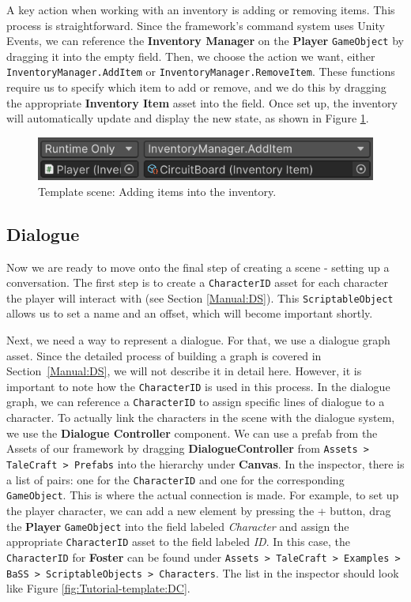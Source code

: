 A key action when working with an inventory is adding or removing items. This process is straightforward. Since the framework's command system uses Unity Events, we can reference the \textbf{Inventory Manager} on the \textbf{Player} \texttt{GameObject} by dragging it into the empty field. Then, we choose the action we want, either \texttt{InventoryManager.AddItem} or \texttt{InventoryManager.RemoveItem}. These functions require us to specify which item to add or remove, and we do this by dragging the appropriate \textbf{Inventory Item} asset into the field. Once set up, the inventory will automatically update and display the new state, as shown in Figure \ref{fig:Tutorial-template:InvAdd}.

\begin{figure}[H]
\centering
\includegraphics[width=1\linewidth]{img/User doc/image_2025-07-09_200842547.png}
\caption{Template scene: Adding items into the inventory.}
\label{fig:Tutorial-template:InvAdd}
\end{figure}

\subsection{Dialogue}
\label{Manual:Tutorial:D}
Now we are ready to move onto the final step of creating a scene - setting up a conversation. The first step is to create a \texttt{CharacterID} asset for each character the player will interact with (see Section \ref{Manual:DS}). This \texttt{ScriptableObject} allows us to set a name and an offset, which will become important shortly.

Next, we need a way to represent a dialogue. For that, we use a dialogue graph asset. Since the detailed process of building a graph is covered in Section~\ref{Manual:DS}, we will not describe it in detail here. However, it is important to note how the \texttt{CharacterID} is used in this process. In the dialogue graph, we can reference a \texttt{CharacterID} to assign specific lines of dialogue to a character. To actually link the characters in the scene with the dialogue system, we use the \textbf{Dialogue Controller} component. We can use a prefab from the Assets of our framework by dragging \textbf{DialogueController} from \texttt{Assets > TaleCraft > Prefabs} into the hierarchy under \textbf{Canvas}. In the inspector, there is a list of pairs: one for the \texttt{CharacterID} and one for the corresponding \texttt{GameObject}. This is where the actual connection is made. For example, to set up the player character, we can add a new element by pressing the + button, drag the \textbf{Player} \texttt{GameObject} into the field labeled \textit{Character} and assign the appropriate \texttt{CharacterID} asset to the field labeled \textit{ID}. In this case, the \texttt{CharacterID} for \textbf{Foster} can be found under \texttt{Assets > TaleCraft > Examples > BaSS > ScriptableObjects > Characters}. The list in the inspector should look like Figure \ref{fig:Tutorial-template:DC}.


